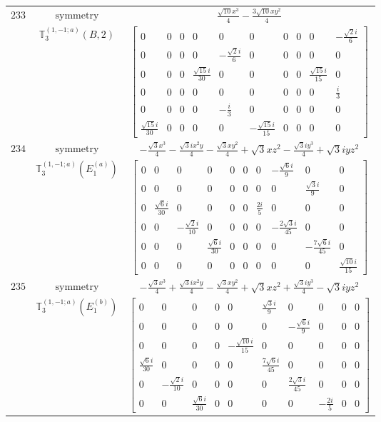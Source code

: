\documentclass[fleqn,8pt,landscape]{jsarticle}
\begin{document}
\begin{longtable}{ccc}
$ 233 $ & $ \text{symmetry} $ & $ \frac{\sqrt{10} x^{3}}{4} - \frac{3 \sqrt{10} x y^{2}}{4} $ \\
$  $ & $ \mathbb{T}_{3}^{(1,-1;a)}(B,2) $ & $ \begin{bmatrix} 0 & 0 & 0 & 0 & 0 & 0 & 0 & 0 & 0 & - \frac{\sqrt{2} i}{6} \\ 0 & 0 & 0 & 0 & - \frac{\sqrt{2} i}{6} & 0 & 0 & 0 & 0 & 0 \\ 0 & 0 & 0 & \frac{\sqrt{15} i}{30} & 0 & 0 & 0 & 0 & \frac{\sqrt{15} i}{15} & 0 \\ 0 & 0 & 0 & 0 & 0 & 0 & 0 & 0 & 0 & \frac{i}{3} \\ 0 & 0 & 0 & 0 & - \frac{i}{3} & 0 & 0 & 0 & 0 & 0 \\ \frac{\sqrt{15} i}{30} & 0 & 0 & 0 & 0 & - \frac{\sqrt{15} i}{15} & 0 & 0 & 0 & 0 \end{bmatrix} $ \\ \hline
$ 234 $ & $ \text{symmetry} $ & $ - \frac{\sqrt{3} x^{3}}{4} - \frac{\sqrt{3} i x^{2} y}{4} - \frac{\sqrt{3} x y^{2}}{4} + \sqrt{3} x z^{2} - \frac{\sqrt{3} i y^{3}}{4} + \sqrt{3} i y z^{2} $ \\
$  $ & $ \mathbb{T}_{3}^{(1,-1;a)}(E_{1}^{(a)}) $ & $ \begin{bmatrix} 0 & 0 & 0 & 0 & 0 & 0 & 0 & - \frac{\sqrt{6} i}{9} & 0 & 0 \\ 0 & 0 & 0 & 0 & 0 & 0 & 0 & 0 & \frac{\sqrt{3} i}{9} & 0 \\ 0 & \frac{\sqrt{6} i}{30} & 0 & 0 & 0 & 0 & \frac{2 i}{5} & 0 & 0 & 0 \\ 0 & 0 & - \frac{\sqrt{2} i}{10} & 0 & 0 & 0 & 0 & - \frac{2 \sqrt{3} i}{45} & 0 & 0 \\ 0 & 0 & 0 & \frac{\sqrt{6} i}{30} & 0 & 0 & 0 & 0 & - \frac{7 \sqrt{6} i}{45} & 0 \\ 0 & 0 & 0 & 0 & 0 & 0 & 0 & 0 & 0 & \frac{\sqrt{10} i}{15} \end{bmatrix} $ \\ \hline
$ 235 $ & $ \text{symmetry} $ & $ - \frac{\sqrt{3} x^{3}}{4} + \frac{\sqrt{3} i x^{2} y}{4} - \frac{\sqrt{3} x y^{2}}{4} + \sqrt{3} x z^{2} + \frac{\sqrt{3} i y^{3}}{4} - \sqrt{3} i y z^{2} $ \\
$  $ & $ \mathbb{T}_{3}^{(1,-1;a)}(E_{1}^{(b)}) $ & $ \begin{bmatrix} 0 & 0 & 0 & 0 & 0 & \frac{\sqrt{3} i}{9} & 0 & 0 & 0 & 0 \\ 0 & 0 & 0 & 0 & 0 & 0 & - \frac{\sqrt{6} i}{9} & 0 & 0 & 0 \\ 0 & 0 & 0 & 0 & - \frac{\sqrt{10} i}{15} & 0 & 0 & 0 & 0 & 0 \\ \frac{\sqrt{6} i}{30} & 0 & 0 & 0 & 0 & \frac{7 \sqrt{6} i}{45} & 0 & 0 & 0 & 0 \\ 0 & - \frac{\sqrt{2} i}{10} & 0 & 0 & 0 & 0 & \frac{2 \sqrt{3} i}{45} & 0 & 0 & 0 \\ 0 & 0 & \frac{\sqrt{6} i}{30} & 0 & 0 & 0 & 0 & - \frac{2 i}{5} & 0 & 0 \end{bmatrix} $ \\ \hline

\end{longtable}
\end{document}
